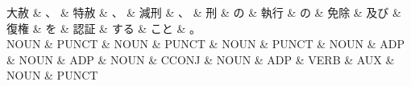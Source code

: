 \documentclass[tikz,border=5pt]{standalone}
\begin{document}
\normalsize
\begin{dependency}[edge unit distance=12.0pt]
    \begin{deptext}[column sep=1em]
        大赦 \& 、 \& 特赦 \& 、 \& 減刑 \& 、 \& 刑 \& の \& 執行 \& の \& 免除 \& 及び \& 復権 \& を \& 認証 \& する \& こと \& 。\\
        NOUN \& PUNCT \& NOUN \& PUNCT \& NOUN \& PUNCT \& NOUN \& ADP \& NOUN \& ADP \& NOUN \& CCONJ \& NOUN \& ADP \& VERB \& AUX \& NOUN \& PUNCT\\
    \end{deptext}
\end{dependency}
\end{document}
